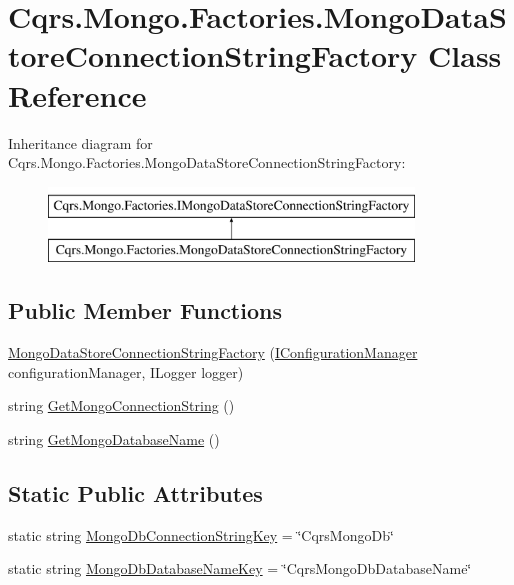 \hypertarget{classCqrs_1_1Mongo_1_1Factories_1_1MongoDataStoreConnectionStringFactory}{}\section{Cqrs.\+Mongo.\+Factories.\+Mongo\+Data\+Store\+Connection\+String\+Factory Class Reference}
\label{classCqrs_1_1Mongo_1_1Factories_1_1MongoDataStoreConnectionStringFactory}
Inheritance diagram for Cqrs.\+Mongo.\+Factories.\+Mongo\+Data\+Store\+Connection\+String\+Factory\+:\begin{figure}[H]
\begin{center}
\leavevmode
\includegraphics[height=2.000000cm]{classCqrs_1_1Mongo_1_1Factories_1_1MongoDataStoreConnectionStringFactory}
\end{center}
\end{figure}
\subsection*{Public Member Functions}
\begin{DoxyCompactItemize}
\item 
\hyperlink{classCqrs_1_1Mongo_1_1Factories_1_1MongoDataStoreConnectionStringFactory_acad4a48959c7d40b5934663d1b71f414}{Mongo\+Data\+Store\+Connection\+String\+Factory} (\hyperlink{interfaceCqrs_1_1Configuration_1_1IConfigurationManager}{I\+Configuration\+Manager} configuration\+Manager, I\+Logger logger)
\item 
string \hyperlink{classCqrs_1_1Mongo_1_1Factories_1_1MongoDataStoreConnectionStringFactory_a33064b1b1cbf06ef4f9e12371c7ef785}{Get\+Mongo\+Connection\+String} ()
\item 
string \hyperlink{classCqrs_1_1Mongo_1_1Factories_1_1MongoDataStoreConnectionStringFactory_a7f330359f2db5b86ad28ac7d8a4c49f1}{Get\+Mongo\+Database\+Name} ()
\end{DoxyCompactItemize}
\subsection*{Static Public Attributes}
\begin{DoxyCompactItemize}
\item 
static string \hyperlink{classCqrs_1_1Mongo_1_1Factories_1_1MongoDataStoreConnectionStringFactory_a3740f3d23c33cc85377d4c9073f61c97}{Mongo\+Db\+Connection\+String\+Key} = \char`\"{}Cqrs\+Mongo\+Db\char`\"{}
\item 
static string \hyperlink{classCqrs_1_1Mongo_1_1Factories_1_1MongoDataStoreConnectionStringFactory_afeca0c0e92ca9d9c83f15b2b03f769a8}{Mongo\+Db\+Database\+Name\+Key} = \char`\"{}Cqrs\+Mongo\+Db\+Database\+Name\char`\"{}
\end{DoxyCompactItemize}
